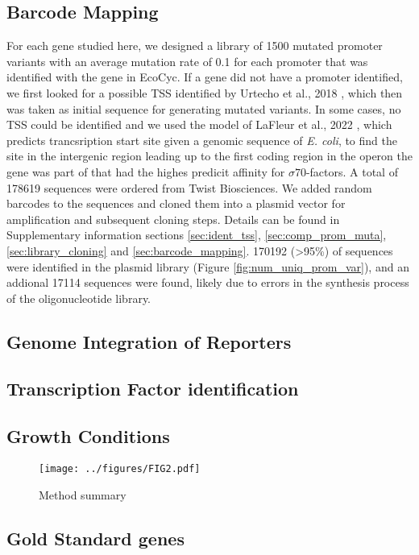 \subsection{Barcode Mapping}
For each gene studied here, we designed a library of 1500 mutated promoter variants with an average mutation rate of 0.1 for each promoter that was identified with the gene in EcoCyc. If a gene did not have a promoter identified, we first looked for a possible TSS identified by Urtecho et al., 2018 \cite{urtecho2018systematic}, which then was taken as initial sequence for generating mutated variants. In some cases, no TSS could be identified and we used the model of LaFleur et al., 2022 \cite{lafleur2022automated}, which predicts trancsription start site given a genomic sequence of \textit{E. coli}, to find the site in the intergenic region leading up to the first coding region in the operon the gene was part of that had the highes predicit affinity for $\sigma70$-factors. A total of 178619 sequences were ordered from Twist Biosciences. We added random barcodes to the sequences and cloned them into a plasmid vector for amplification and subsequent cloning steps. Details can be found in Supplementary information sections \ref{sec:ident_tss}, \ref{sec:comp_prom_muta}, \ref{sec:library_cloning} and  \ref{sec:barcode_mapping}. 170192 (>95\%) of sequences were identified in the plasmid library (Figure \ref{fig:num_uniq_prom_var}), and an addional 17114 sequences were found, likely due to errors in the synthesis process of the oligonucleotide library. 


\subsection{Genome Integration of Reporters}




\subsection{Transcription Factor identification}
\subsection{Growth Conditions}
\begin{figure}
    \centering
    \texttt{[image: ../figures/FIG2.pdf]}
    \caption{Method summary}
    \label{fig:method_sum}
\end{figure}
\subsection{Gold Standard genes}
